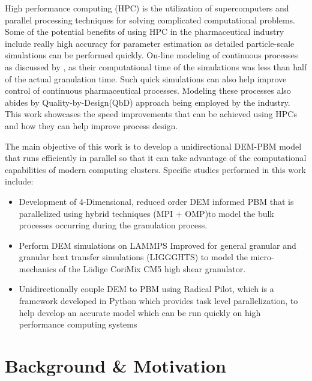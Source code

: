 \documentclass[preprint,11pt,authoryear]{elsarticle}
\begin{document}
High performance computing (HPC) is the utilization of supercomputers and parallel processing
techniques for solving complicated computational problems. Some of the potential benefits of using
HPC in the pharmaceutical industry include really high accuracy for parameter estimation as detailed 
particle-scale simulations can be performed quickly. On-line modeling of continuous processes as 
discussed by \citep{Bettencourt2017}, as their computational time of the simulations was less than 
half of the actual granulation time. Such quick simulations can also help improve control of 
continuous pharmaceutical processes. Modeling these processes also abides by 
Quality-by-Design(QbD) approach being employed by the industry. This work showcases the speed 
improvements that can be achieved using HPCs and how they can help improve process design.

The main objective of this work is to develop a unidirectional DEM-PBM model 
that runs efficiently in 
parallel so that it can take advantage of the computational capabilities of  modern computing 
clusters. Specific studies performed in this work include:
\begin{itemize}
\item Development of 4-Dimensional, reduced order DEM informed PBM that is parallelized using hybrid 
techniques (MPI + OMP)to model the bulk processes occurring during the granulation process.
\item Perform DEM simulations on LAMMPS Improved for general granular and granular heat transfer 
simulations (LIGGGHTS) to  model the micro-mechanics of the L\"{o}dige CoriMix 
CM5 high shear granulator. 
\item Unidirectionally couple DEM to PBM using Radical Pilot, which is a framework developed in
Python which provides task level parallelization, to help develop an accurate model which can be 
run quickly on high performance computing systems
\end{itemize}

\section{Background \& Motivation}
\end{document}
